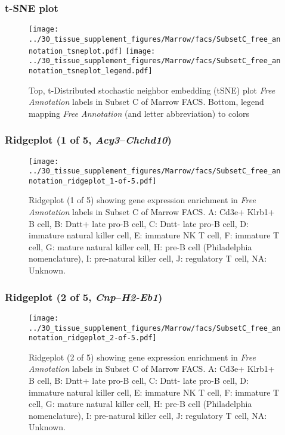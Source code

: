 \clearpage
\subsubsection{t-SNE plot}
\begin{figure}[h]
\centering
\texttt{[image: ../30\_tissue\_supplement\_figures/Marrow/facs/SubsetC\_free\_annotation\_tsneplot.pdf]}
\texttt{[image: ../30\_tissue\_supplement\_figures/Marrow/facs/SubsetC\_free\_annotation\_tsneplot\_legend.pdf]}
\caption{Top, t-Distributed stochastic neighbor embedding (tSNE) plot  \emph{Free Annotation} labels in Subset C of Marrow FACS. Bottom, legend mapping \emph{Free Annotation} (and letter abbreviation) to colors}
\end{figure}


\clearpage

\subsubsection{Ridgeplot (1 of 5, \emph{Acy3}--\emph{Chchd10})}
\begin{figure}[h]
\centering
\texttt{[image: ../30\_tissue\_supplement\_figures/Marrow/facs/SubsetC\_free\_annotation\_ridgeplot\_1-of-5.pdf]}

\caption{ Ridgeplot (1 of 5)  showing gene expression enrichment in \emph{Free Annotation} labels in Subset C of Marrow FACS. A: Cd3e+ Klrb1+ B cell, B: Dntt+ late pro-B cell, C: Dntt- late pro-B cell, D: immature natural killer cell, E: immature NK T cell, F: immature T cell, G: mature natural killer cell, H: pre-B cell (Philadelphia nomenclature), I: pre-natural killer cell, J: regulatory T cell, NA: Unknown.}
\end{figure}


\clearpage

\subsubsection{Ridgeplot (2 of 5, \emph{Cnp}--\emph{H2-Eb1})}
\begin{figure}[h]
\centering
\texttt{[image: ../30\_tissue\_supplement\_figures/Marrow/facs/SubsetC\_free\_annotation\_ridgeplot\_2-of-5.pdf]}

\caption{ Ridgeplot (2 of 5)  showing gene expression enrichment in \emph{Free Annotation} labels in Subset C of Marrow FACS. A: Cd3e+ Klrb1+ B cell, B: Dntt+ late pro-B cell, C: Dntt- late pro-B cell, D: immature natural killer cell, E: immature NK T cell, F: immature T cell, G: mature natural killer cell, H: pre-B cell (Philadelphia nomenclature), I: pre-natural killer cell, J: regulatory T cell, NA: Unknown.}
\end{figure}


